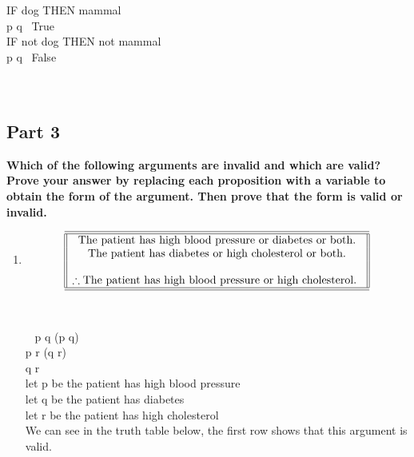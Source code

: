 \begin{enumerate}
\begin{enumerate}[label=(\alph*)]
IF dog THEN mammal \\
p \to q \ True \\

IF not dog THEN not mammal \\
\neg p \to \neg q \ False \\

\\\\
\end{enumerate}

\subsection*{Part 3}
{\bf Which of the following arguments are invalid and which are valid? Prove your answer by replacing each proposition with a variable to obtain the form of the argument. Then prove that the form is valid or invalid.}\\
 \begin{enumerate}[label=(\alph*)]
  \item \[
\begin{array}{||c||}
\hline \hline
\text{The patient has high blood pressure or diabetes or both.}\\
\text {The patient has diabetes or high cholesterol or both.}\\
\\
\therefore \text {The patient has high blood pressure or high cholesterol.
}\\
\hline \hline
\end{array}
\]\\\\\
p \lor q \lor (p \lor q) \\
p \lor r \lor (q \lor r) \\
\therefore q \lor r \\

let p be the patient has high blood pressure \\

let q be the patient has diabetes \\

let r be the patient has high cholesterol \\

We can see in the truth table below, the first row shows that this argument is valid. \\


\end{enumerate}
\end{enumerate}
